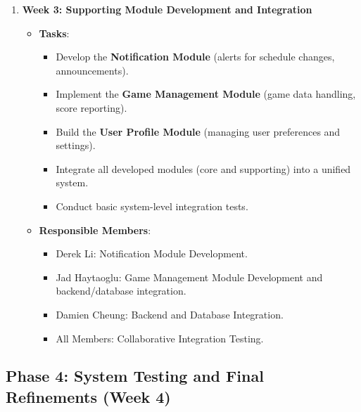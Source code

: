 \documentclass[12pt, titlepage]{article}
\begin{document}
\begin{enumerate}
    \item \textbf{Week 3: Supporting Module Development and Integration}
    \begin{itemize}
        \item \textbf{Tasks}:
        \begin{itemize}
            \item Develop the \textbf{Notification Module} (alerts for schedule changes, announcements).
            \item Implement the \textbf{Game Management Module} (game data handling, score reporting).
            \item Build the \textbf{User Profile Module} (managing user preferences and settings).
            \item Integrate all developed modules (core and supporting) into a unified system.
            \item Conduct basic system-level integration tests.
        \end{itemize}
        \item \textbf{Responsible Members}:
        \begin{itemize}
            \item Derek Li: Notification Module Development.
            \item Jad Haytaoglu: Game Management Module Development and backend/database integration.
            \item Damien Cheung: Backend and Database Integration.
            \item All Members: Collaborative Integration Testing.
        \end{itemize}
    \end{itemize}
\end{enumerate}

\subsection*{Phase 4: System Testing and Final Refinements (Week 4)}
\end{document}
